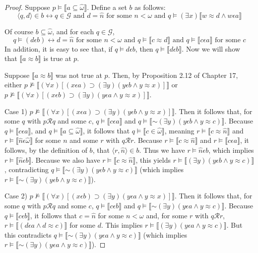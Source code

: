 \documentclass{article}
\newcommand*{\oldneg}{\mathord{\sim}}
\newcommand{\lbc}{\llbracket}
\newcommand{\rbc}{\rrbracket}
\theoremstyle{definition}
\begin{document}
\begin{proof}
Suppose $p\vDash\lbc a\subseteq\hat{\omega}\rbc$. Define a set $b$ as follows:
\[ \langle q,d\rangle\in b\leftrightarrow q\in\mathcal{G}\textrm{ and }
d=\hat{n}\textrm{ for some }n<\omega\textrm{ and }q\vDash(\exists x)\lbc w\approx d\wedge w\epsilon a\rbc \]

Of course $b\subseteq\hat{\omega}$, and for each $q\in\mathcal{G}$,
\[ q\vDash (d\epsilon b)\leftrightarrow d=\hat{n}\textrm{ for some }n<\omega\textrm{ and }q\vDash\lbc c\approx d\rbc
\textrm{ and }q\vDash\lbc c\epsilon a\rbc\textrm{ for some }c \]
In addition, it is easy to see that, if $q\vDash d\epsilon b$, then $q\vDash\lbc d\epsilon b\rbc$. Now we will show that 
$\lbc a\approx b\rbc$ is true at $p$.

Suppose $\lbc a\approx b\rbc$ was not true at $p$. Then, by Proposition 2.12 of Chapter 17, either 
$p\nvDash\lbc(\forall x)[(x\epsilon a)\supset(\exists y)(y\epsilon b\wedge y\approx x)]\rbc$ or 
$p\nvDash\lbc(\forall x)[(x\epsilon b)\supset(\exists y)(y\epsilon a\wedge y\approx x)]\rbc$.

Case 1) $p\nvDash\lbc(\forall x)[(x\epsilon a)\supset(\exists y)(y\epsilon b\wedge y\approx x)]\rbc$. Then it follows that, 
for some $q$ with $p\mathcal{R}q$ and some $c$, 
$q\vDash\lbc c\epsilon a\rbc$ and $q\vDash\lbc\oldneg(\exists y)(y\epsilon b\wedge y\approx c)\rbc$. Because 
$q\vDash\lbc c\epsilon a\rbc$, and $q\vDash\lbc a\subseteq\hat{\omega}\rbc$, it follows that 
$q\vDash\lbc c\in\hat{\omega}\rbc$, meaning $r\vDash\lbc c\approx\hat{n}\rbc$ and 
$r\vDash\lbc\hat{n}\epsilon\hat{\omega}\rbc$ for some $n$ and some $r$ with $q\mathcal{R}r$. Because 
$r\vDash\lbc c\approx\hat{n}\rbc$ and $r\vDash\lbc c\epsilon a\rbc$, it follows, by the definition of 
$b$, that $\langle r,\hat{n}\rangle\in b$. Thus we have $r\vDash\hat{n}\epsilon b$, which implies 
$r\vDash\lbc\hat{n}\epsilon b\rbc$. Because we also have $r\vDash\lbc c\approx\hat{n}\rbc$, this yields 
$r\vDash\lbc(\exists y)(y\epsilon b\wedge y\approx c)\rbc$, contradicting 
$q\vDash\lbc\oldneg(\exists y)(y\epsilon b\wedge y\approx c)\rbc$ (which implies 
$r\vDash\lbc\oldneg(\exists y)(y\epsilon b\wedge y\approx c)\rbc$). 

Case 2) $p\nvDash\lbc(\forall x)[(x\epsilon b)\supset(\exists y)(y\epsilon a\wedge y\approx x)]\rbc$. Then it follows that, 
for some $q$ with $p\mathcal{R}q$ and some $c$,
$q\vDash\lbc c\epsilon b\rbc$ and $q\vDash\lbc\oldneg(\exists y)(y\epsilon a\wedge y\approx c)\rbc$. Because
$q\vDash\lbc c\epsilon b\rbc$, it follows that 
$c=\hat{n}$ for some $n<\omega$ and, for some $r$ with $q\mathcal{R}r$, 
$r\vDash\lbc (d\epsilon a\wedge d\approx c)\rbc$ for some $d$. This implies 
$r\vDash\lbc(\exists y)(y\epsilon a\wedge y\approx c)\rbc$. But this contradicts 
$q\vDash\lbc\oldneg(\exists y)(y\epsilon a\wedge y\approx c)\rbc$ (which implies
$r\vDash\lbc\oldneg(\exists y)(y\epsilon a\wedge y\approx c)\rbc$). 

\end{proof}
\end{document}
